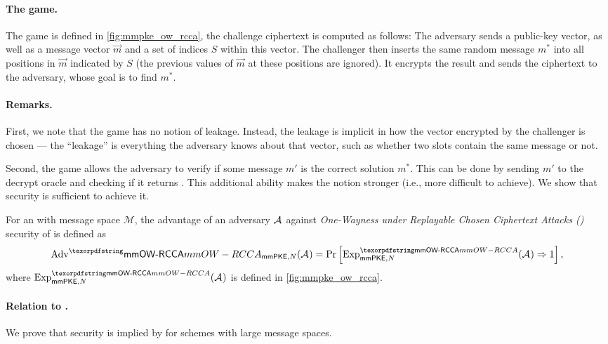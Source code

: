 \paragraph{The game.} The \mmowrcca game is defined in \cref{fig:mmpke_ow_rcca}, the challenge ciphertext is computed as follows: The adversary sends a public-key vector, as well as a message vector $\vec m$ and a set of indices $S$ within this vector. The challenger then inserts the same random message $m^*$ into all positions in $\vec m$ indicated by $S$ (the previous values of $\vec m$ at these positions are ignored). It encrypts the result and sends the ciphertext to the adversary, whose goal is to find $m^*$.

\paragraph{Remarks.} First, we note that the \mmowrcca game has no notion of leakage. Instead, the leakage is implicit in how the vector encrypted by the challenger is chosen --- the ``leakage'' is everything the adversary knows about that vector, such as whether two slots contain the same message or not.

Second, the game allows the adversary to verify if some message $m'$ is the correct solution $m^*$. This can be done by sending $m'$ to the decrypt oracle and checking if it returns . This additional ability makes the notion stronger (i.e., more difficult to achieve). We show that \mmindrcca security is sufficient to achieve it.


\begin{definition}[\mmowrcca]\label{def:mmowrcca}
For an \mmPKE with message space $\mathcal M$, the advantage of an adversary $\mathcal{A}_{\relax}$ against \emph{One-Wayness under Replayable Chosen Ciphertext Attacks (\mmowrcca)} security of \mmPKE is defined as
\begin{equation*}
  \textnormal{Adv}^\mmowrcca_{\mmPKE,N}(\Adv) = \Pr\left[\experiment{\mmowrcca}{\mmPKE,N}(\Adv) \Rightarrow 1 \right],
\end{equation*}
where $\experiment{\mmowrcca}{\mmPKE,N}(\Adv)$ is defined in \cref{fig:mmpke_ow_rcca}.
\end{definition}

\paragraph{Relation to \mmindcca.}
We prove that \mmowrcca security is implied by \mmindrcca for schemes with large message spaces.

